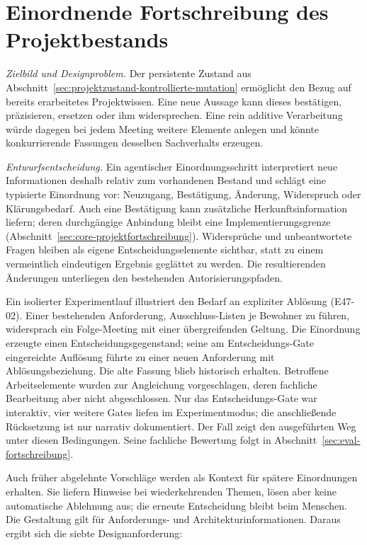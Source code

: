 \section{Einordnende Fortschreibung des Projektbestands}
\label{sec:einordnende-fortschreibung}

\emph{Zielbild und Designproblem.} Der persistente Zustand aus
Abschnitt~\ref{sec:projektzustand-kontrollierte-mutation} ermöglicht
den Bezug auf bereits erarbeitetes Projektwissen. Eine neue Aussage
kann dieses bestätigen, präzisieren, ersetzen oder ihm widersprechen.
Eine rein additive Verarbeitung würde dagegen bei jedem Meeting
weitere Elemente anlegen und könnte konkurrierende Fassungen
desselben Sachverhalts erzeugen.

\emph{Entwurfsentscheidung.} Ein agentischer Einordnungsschritt
interpretiert neue Informationen deshalb relativ zum vorhandenen
Bestand und schlägt eine typisierte Einordnung vor: Neuzugang,
Bestätigung, Änderung, Widerspruch oder Klärungsbedarf. Auch eine
Bestätigung kann zusätzliche Herkunftsinformation liefern; deren
durchgängige Anbindung bleibt eine Implementierungsgrenze
(Abschnitt~\ref{sec:core-projektfortschreibung}). Widersprüche
und unbeantwortete Fragen bleiben als eigene
Entscheidungselemente sichtbar, statt zu einem vermeintlich
eindeutigen Ergebnis geglättet zu werden. Die resultierenden
Änderungen unterliegen den bestehenden Autorisierungspfaden.

Ein isolierter Experimentlauf illustriert den Bedarf an expliziter
Ablösung (E47-02). Einer bestehenden Anforderung, Ausschluss-Listen
je Bewohner zu führen, widersprach ein Folge-Meeting mit einer
übergreifenden Geltung. Die Einordnung erzeugte einen
Entscheidungsgegenstand; seine am Entscheidungs-Gate eingereichte
Auflösung führte zu einer neuen Anforderung mit Ablösungsbeziehung.
Die alte Fassung blieb historisch erhalten. Betroffene Arbeitselemente
wurden zur Angleichung vorgeschlagen, deren fachliche Bearbeitung
aber nicht abgeschlossen. Nur das Entscheidungs-Gate war interaktiv,
vier weitere Gates liefen im Experimentmodus; die anschließende
Rücksetzung ist nur narrativ dokumentiert. Der Fall zeigt den
ausgeführten Weg unter diesen Bedingungen. Seine fachliche Bewertung
folgt in Abschnitt~\ref{sec:eval-fortschreibung}.

Auch früher abgelehnte Vorschläge werden als Kontext für spätere
Einordnungen erhalten. Sie liefern Hinweise bei wiederkehrenden
Themen, lösen aber keine automatische Ablehnung aus; die erneute
Entscheidung bleibt beim Menschen. Die Gestaltung gilt für
Anforderungs- und Architekturinformationen. Daraus ergibt sich die
siebte Designanforderung:

